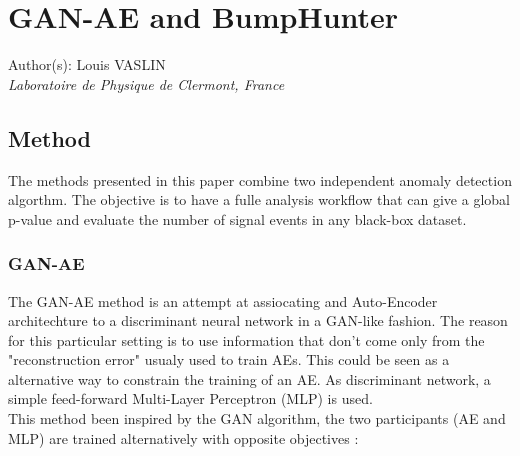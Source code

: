 \documentclass[letterpaper,11pt]{article}
\begin{document}
\section*{GAN-AE and BumpHunter}
Author(s): Louis VASLIN \\ \textit{Laboratoire de Physique de Clermont, France}\\


\subsection{Method}
\label{sec:method}

\noindent The methods presented in this paper combine two independent anomaly detection algorthm.
The objective is to have a fulle analysis workflow that can give a global p-value and evaluate the number of signal events in any black-box dataset.

\subsubsection{GAN-AE}
\label{sec:GAN-AE}

\noindent The GAN-AE method is an attempt at assiocating and Auto-Encoder architechture to a discriminant neural network in a GAN-like fashion.
The reason for this particular setting is to use information that don't come only from the "reconstruction error" usualy used to train AEs.
This could be seen as a alternative way to constrain the training of an AE.
As discriminant network, a simple feed-forward Multi-Layer Perceptron (MLP) is used. \\

\noindent This method been inspired by the GAN algorithm, the two participants (AE and MLP) are trained alternatively with opposite objectives :
\end{document}
